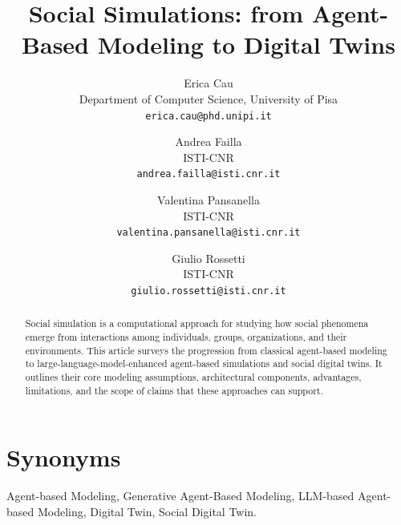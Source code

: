 \documentclass[11pt]{article}
\title{Social Simulations: from Agent-Based Modeling to Digital Twins}
\author{
Erica Cau\\
\small Department of Computer Science, University of Pisa\\
\small \texttt{erica.cau@phd.unipi.it}
\and
Andrea Failla\\
\small  ISTI-CNR\\
\small \texttt{andrea.failla@isti.cnr.it}
\and
Valentina Pansanella\\
\small ISTI-CNR\\
\small \texttt{valentina.pansanella@isti.cnr.it}
\and
Giulio Rossetti\\
\small ISTI-CNR\\
\small \texttt{giulio.rossetti@isti.cnr.it}
}
\date{}
\begin{document}
\maketitle

\begin{abstract}
Social simulation is a computational approach for studying how social phenomena emerge from interactions among individuals, groups, organizations, and their environments. This article surveys the progression from classical agent-based modeling to large-language-model-enhanced agent-based simulations and social digital twins. It outlines their core modeling assumptions, architectural components, advantages, limitations, and the scope of claims that these approaches can support.
\end{abstract}

\section*{Synonyms}
Agent-based Modeling, Generative Agent-Based Modeling, LLM-based Agent-based Modeling, Digital Twin, Social Digital Twin.
\end{document}
